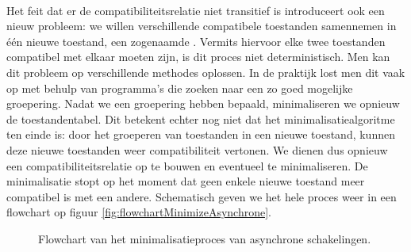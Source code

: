 \paragraph{}
Het feit dat er de compatibiliteitsrelatie niet transitief is introduceert ook een nieuw probleem: we willen verschillende compatibele toestanden samennemen in \'e\'en nieuwe toestand, een zogenaamde . Vermits hiervoor elke twee toestanden compatibel met elkaar moeten zijn, is dit proces niet deterministisch. Men kan dit probleem op verschillende methodes oplossen. In de praktijk lost men dit vaak op met behulp van programma's die zoeken naar een zo goed mogelijke groepering. Nadat we een groepering hebben bepaald, minimaliseren we opnieuw de toestandentabel. Dit betekent echter nog niet dat het minimalisatiealgoritme ten einde is: door het groeperen van toestanden in een nieuwe toestand, kunnen deze nieuwe toestanden weer compatibiliteit vertonen. We dienen dus opnieuw een compatibiliteitsrelatie op te bouwen en eventueel te minimaliseren. De minimalisatie stopt op het moment dat geen enkele nieuwe toestand meer compatibel is met een andere. Schematisch geven we het hele proces weer in een flowchart op figuur \ref{fig:flowchartMinimizeAsynchrone}.
\begin{figure}[hbt]
\centering
{}
\caption{Flowchart van het minimalisatieproces van asynchrone schakelingen.}
\end{figure}
